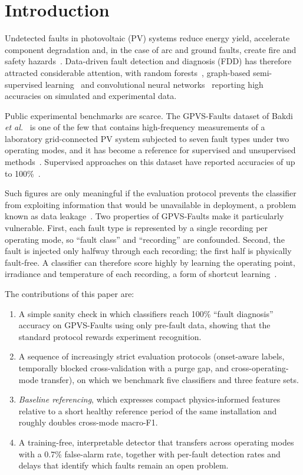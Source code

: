 \documentclass[conference]{IEEEtran}
\begin{document}
\section{Introduction}
Undetected faults in photovoltaic (PV) systems reduce energy yield, accelerate component degradation and, in the case of arc and ground faults, create fire and safety hazards~\cite{mellit2018review,pillai2018review,madeti2017faults}. Data-driven fault detection and diagnosis (FDD) has therefore attracted considerable attention, with random forests~\cite{chen2018rf}, graph-based semi-supervised learning~\cite{zhao2015graph} and convolutional neural networks~\cite{aziz2020cnn} reporting high accuracies on simulated and experimental data.

Public experimental benchmarks are scarce. The GPVS-Faults dataset of Bakdi \emph{et al.}~\cite{bakdi2021realtime,bakdi2020gpvs} is one of the few that contains high-frequency measurements of a laboratory grid-connected PV system subjected to seven fault types under two operating modes, and it has become a reference for supervised and unsupervised methods~\cite{wali2021explainable,jorry2026kernel}. Supervised approaches on this dataset have reported accuracies of up to 100\%~\cite{wali2021explainable}.

Such figures are only meaningful if the evaluation protocol prevents the classifier from exploiting information that would be unavailable in deployment, a problem known as data leakage~\cite{kaufman2012leakage,kapoor2023leakage}. Two properties of GPVS-Faults make it particularly vulnerable. First, each fault type is represented by a single recording per operating mode, so ``fault class'' and ``recording'' are confounded. Second, the fault is injected only halfway through each recording; the first half is physically fault-free. A classifier can therefore score highly by learning the operating point, irradiance and temperature of each recording, a form of shortcut learning~\cite{geirhos2020shortcut}.

The contributions of this paper are:
\begin{enumerate}
\item A simple sanity check in which classifiers reach 100\% ``fault diagnosis'' accuracy on GPVS-Faults using only pre-fault data, showing that the standard protocol rewards experiment recognition.
\item A sequence of increasingly strict evaluation protocols (onset-aware labels, temporally blocked cross-validation with a purge gap, and cross-operating-mode transfer), on which we benchmark five classifiers and three feature sets.
\item \emph{Baseline referencing}, which expresses compact physics-informed features relative to a short healthy reference period of the same installation and roughly doubles cross-mode macro-F1.
\item A training-free, interpretable detector that transfers across operating modes with a 0.7\% false-alarm rate, together with per-fault detection rates and delays that identify which faults remain an open problem.
\end{enumerate}
\end{document}
